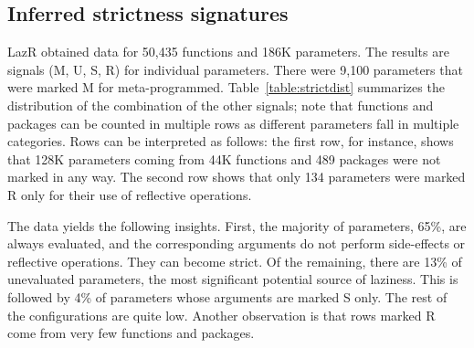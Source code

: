 \documentclass[review,creen,acmsmall]{acmart}
\newcommand{\lazr}{{\sf LazR}\xspace}
\begin{document}
\subsection{Inferred strictness signatures}\label{sec:results}

\lazr obtained data for 50,435 functions and 186K parameters. The results are
signals (M, U, S, R) for individual parameters. There were 9,100 parameters that
were marked M for meta-programmed. Table~\ref{table:strictdist} summarizes the
distribution of the combination of the other signals; note that functions and
packages can be counted in multiple rows as different parameters fall in
multiple categories. Rows can be interpreted as follows: the first row, for
instance, shows that 128K parameters coming from 44K functions and 489 packages
were not marked in any way. The second row shows that only 134 parameters
were marked R only for their use of reflective operations.

The data yields the following insights. First, the majority of parameters, 65\%,
are always evaluated, and the corresponding arguments do not perform
side-effects or reflective operations. They can become strict. Of the remaining,
there are 13\% of unevaluated parameters, the most significant potential source of
laziness. This is followed by 4\% of parameters whose arguments are marked S
only. The rest of the configurations are quite low. Another observation is that
rows marked R come from very few functions and packages.
\end{document}
